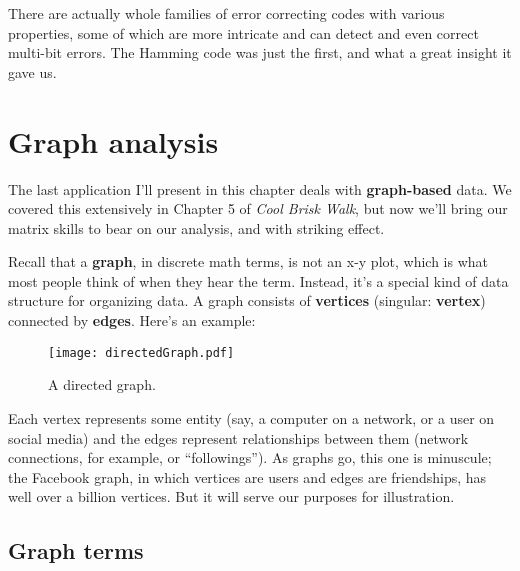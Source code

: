 There are actually whole families of error correcting codes with various
properties, some of which are more intricate and can detect and even correct
multi-bit errors. The Hamming code was just the first, and what a great insight
it gave us.



\pagebreak

\renewcommand{\thesubsection}{G\arabic{subsection}.}%
\section{Graph analysis}


The last application I'll present in this chapter deals with
\textbf{graph-based} data. We covered this extensively in Chapter 5 of
\textit{Cool Brisk Walk}, but now we'll bring our matrix skills to bear on our
analysis, and with striking effect.


Recall that a \textbf{graph}, in discrete math terms, is not an x-y plot,
which is what most people think of when they hear the term. Instead, it's a
special kind of data structure for organizing data. A graph consists of
\textbf{vertices} (singular: \textbf{vertex}) connected by \textbf{edges}.
Here's an example:

\begin{figure}[ht]
\centering
\texttt{[image: directedGraph.pdf]}
\caption{A directed graph.}
\label{fig:directedGraph}
\end{figure}

Each vertex represents some entity (say, a computer on a network, or a user on
social media) and the edges represent relationships between them (network
connections, for example, or ``followings''). As graphs go, this one is
minuscule; the Facebook graph, in which vertices are users and edges are
friendships, has well over a billion vertices. But it will serve our purposes
for illustration.


\subsection{Graph terms}

